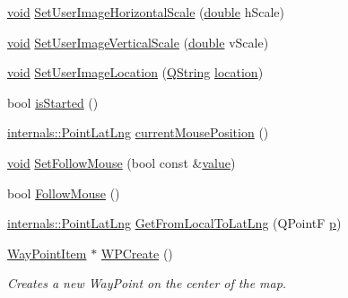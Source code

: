 \begin{DoxyCompactItemize}
\item 
\hyperlink{group___u_a_v_objects_plugin_ga444cf2ff3f0ecbe028adce838d373f5c}{void} \hyperlink{group___o_p_map_widget_gad61028ad754a5341e96c7f2e0e8c13f0}{Set\-User\-Image\-Horizontal\-Scale} (\hyperlink{_super_l_u_support_8h_a8956b2b9f49bf918deed98379d159ca7}{double} h\-Scale)
\item 
\hyperlink{group___u_a_v_objects_plugin_ga444cf2ff3f0ecbe028adce838d373f5c}{void} \hyperlink{group___o_p_map_widget_gaac2d5997b77a7b661f1d983316e4f825}{Set\-User\-Image\-Vertical\-Scale} (\hyperlink{_super_l_u_support_8h_a8956b2b9f49bf918deed98379d159ca7}{double} v\-Scale)
\item 
\hyperlink{group___u_a_v_objects_plugin_ga444cf2ff3f0ecbe028adce838d373f5c}{void} \hyperlink{group___o_p_map_widget_gab46d43fc65b333d32a79056ca882caa0}{Set\-User\-Image\-Location} (\hyperlink{group___u_a_v_objects_plugin_gab9d252f49c333c94a72f97ce3105a32d}{Q\-String} \hyperlink{glext_8h_a6f0165ed903f22b8bb600c3e0b628e73}{location})
\item 
bool \hyperlink{group___o_p_map_widget_ga1a79fb1b73da4c902626f6dcee9fa372}{is\-Started} ()
\item 
\hyperlink{structinternals_1_1_point_lat_lng}{internals\-::\-Point\-Lat\-Lng} \hyperlink{group___o_p_map_widget_gabb9370f367fc42a3987983e79db0828a}{current\-Mouse\-Position} ()
\item 
\hyperlink{group___u_a_v_objects_plugin_ga444cf2ff3f0ecbe028adce838d373f5c}{void} \hyperlink{group___o_p_map_widget_ga9713d4bd6a80debb60fbb66d3e55ebd3}{Set\-Follow\-Mouse} (bool const \&\hyperlink{glext_8h_aa0e2e9cea7f208d28acda0480144beb0}{value})
\item 
bool \hyperlink{group___o_p_map_widget_gab4d31649441240def7d389c4d814c6a2}{Follow\-Mouse} ()
\item 
\hyperlink{structinternals_1_1_point_lat_lng}{internals\-::\-Point\-Lat\-Lng} \hyperlink{group___o_p_map_widget_ga350ef32ca621e11b3d5a2d3fe4aeaca6}{Get\-From\-Local\-To\-Lat\-Lng} (Q\-Point\-F \hyperlink{glext_8h_aa5367c14d90f462230c2611b81b41d23}{p})
\item 
\hyperlink{classmapcontrol_1_1_way_point_item}{Way\-Point\-Item} $\ast$ \hyperlink{group___o_p_map_widget_ga7a23e7347fa5504a5af7d58e66161fa2}{W\-P\-Create} ()
\begin{DoxyCompactList}\small\item\em Creates a new Way\-Point on the center of the map. \end{DoxyCompactList}\item 

\end{DoxyCompactItemize}
